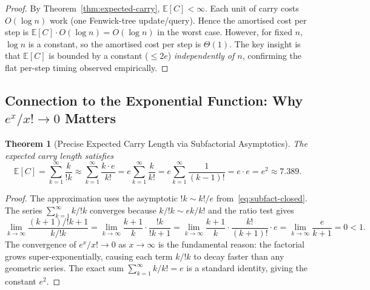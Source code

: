 \documentclass[11pt,a4paper]{article}
\newtheorem{theorem}{Theorem}[section]
\newcommand{\subfact}[1]{!{#1}} %
\begin{document}
    \begin{proof}
        By Theorem~\ref{thm:expected-carry}, $\mathbb{E}[C] < \infty$. Each unit of carry costs $O(\log n)$
        work (one Fenwick-tree update/query). Hence the amortised cost per step is
        $\mathbb{E}[C] \cdot O(\log n) = O(\log n)$ in the worst case. However, for fixed $n$,
        $\log n$ is a constant, so the amortised cost per step is $\Theta(1)$.
        The key insight is that $\mathbb{E}[C]$ is bounded by a constant ($\leq 2e$)
        \emph{independently of $n$}, confirming the flat per-step timing observed
        empirically.
    \end{proof}

    \subsection{Connection to the Exponential Function: Why $e^x/x! \to 0$ Matters}

    \begin{theorem}[Precise Expected Carry Length via Subfactorial Asymptotics]
        \label{thm:e2-constant}
        The expected carry length satisfies
        \begin{equation}
            \mathbb{E}[C] = \sum_{k=1}^{\infty} \frac{k}{\subfact{k}}
            \approx \sum_{k=1}^{\infty} \frac{k \cdot e}{k!}
            = e \sum_{k=1}^{\infty} \frac{k}{k!}
            = e \sum_{k=1}^{\infty} \frac{1}{(k-1)!}
            = e \cdot e = e^2 \approx 7.389.
            \label{eq:e2}
        \end{equation}
    \end{theorem}

    \begin{proof}
        The approximation uses the asymptotic $\subfact{k} \sim k!/e$ from~\eqref{eq:subfact-closed}.
        The series $\sum_{k=1}^{\infty} k/\subfact{k}$ converges because
        $k/\subfact{k} \sim ek/k!$ and the ratio test gives
        \[
            \lim_{k \to \infty} \frac{(k+1)/\subfact{k+1}}{k/\subfact{k}}
            = \lim_{k \to \infty} \frac{k+1}{k} \cdot \frac{\subfact{k}}{\subfact{k+1}}
            = \lim_{k \to \infty} \frac{k+1}{k} \cdot \frac{k!}{(k+1)!} \cdot e
            = \lim_{k \to \infty} \frac{e}{k+1} = 0 < 1.
        \]
        The convergence of $e^x/x! \to 0$ as $x \to \infty$ is the fundamental
        reason: the factorial grows super-exponentially, causing each term
        $k/\subfact{k}$ to decay faster than any geometric series. The exact sum
        $\sum_{k=1}^{\infty} k/k! = e$ is a standard identity, giving the constant $e^2$.
    \end{proof}
\end{document}
